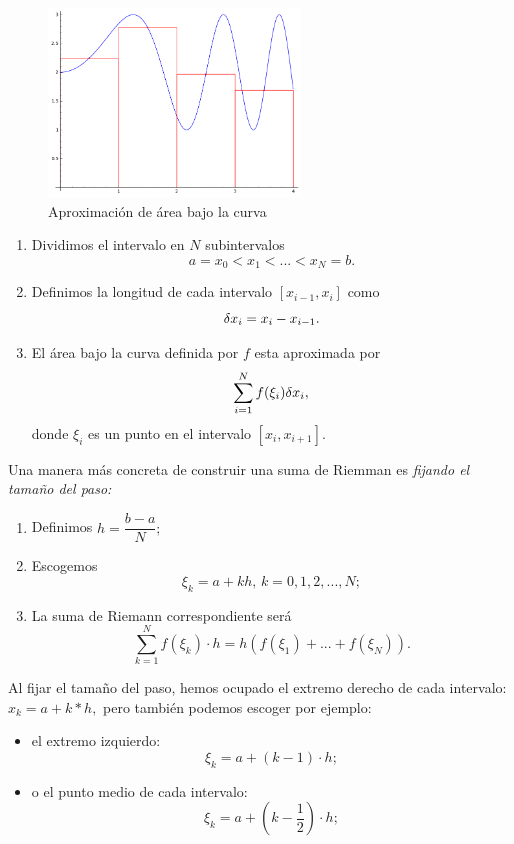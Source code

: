 	\begin{figure}
		\centering
		\includegraphics[height=5cm,keepaspectratio=true]{./calculo/tmp_h5b5ua.png}
		\caption{Aproximación de área bajo la curva}
		\label{fig:ayr:23.2}
	\end{figure}
	



	\begin{alg}
		\label{suma:riemann}
		\begin{enumerate}
			\item Dividimos el intervalo en $N$ subintervalos
			$$a=x_{0}<x_{1}<...<x_{N}=b.$$
			
			\item Definimos la longitud de cada intervalo $[x_{i-1},x_{i}]$ como $$\delta x_{i}=x_{i}-x_{i-1}.$$
			
			\item El área bajo la curva definida por $f$ esta aproximada por
			$$\sum_{i=1}^{N} f(\xi_{i})\delta x_{i},$$
			donde $\xi_{i}$ es un punto en el intervalo $[x_{i},x_{i+1}].$
		\end{enumerate}
	\end{alg}



	Una manera más concreta de construir una suma de Riemman es \emph{fijando el tamaño del paso:}
	\begin{enumerate}
		\item Definimos $h=\dfrac{b-a}{N};$ 
		\item Escogemos $$\xi_{k}=a+kh, \, k=0,1,2,...,N;$$
		\item La suma de Riemann correspondiente será
		$$
		\sum_{k=1}^{N}f(\xi_{k})\cdot h=h\left( f(\xi_{1})+...+f(\xi_{N}) \right).
		$$
	\end{enumerate}
	



	Al fijar el tamaño del paso, hemos ocupado el extremo derecho de cada intervalo: $x_{k}=a+k*h,$ pero también podemos escoger por ejemplo:
	\begin{itemize}
		\item el extremo izquierdo:
		$$\xi_{k}=a+(k-1)\cdot h;$$ 
		\item o el punto medio de cada intervalo:
		$$\xi_{k}=a+\left( k-\dfrac{1}{2} \right) \cdot h;$$
	\end{itemize}
	




